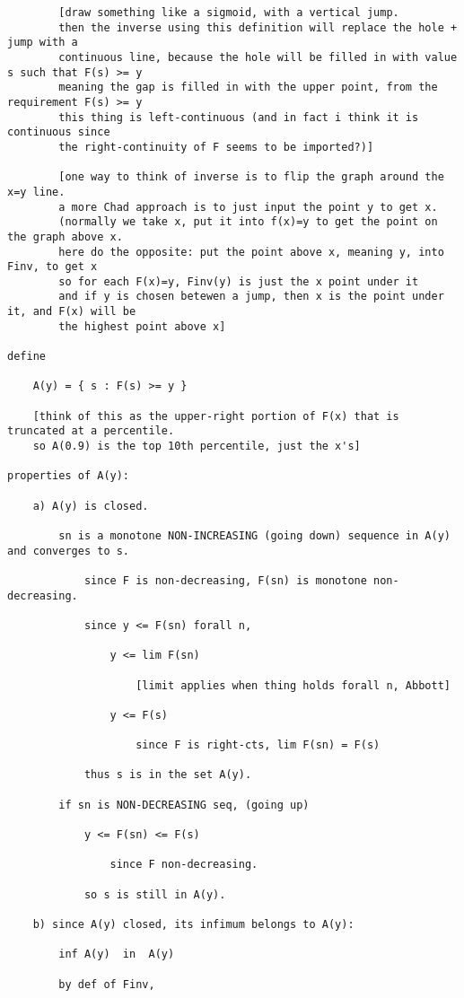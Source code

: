 \documentclass{article}
\begin{document}
\begin{flushleft}
\begin{verbatim}
		[draw something like a sigmoid, with a vertical jump.
		then the inverse using this definition will replace the hole + jump with a
		continuous line, because the hole will be filled in with value s such that F(s) >= y
		meaning the gap is filled in with the upper point, from the requirement F(s) >= y
		this thing is left-continuous (and in fact i think it is continuous since 
		the right-continuity of F seems to be imported?)]
		
		[one way to think of inverse is to flip the graph around the x=y line.
		a more Chad approach is to just input the point y to get x.
		(normally we take x, put it into f(x)=y to get the point on the graph above x.
		here do the opposite: put the point above x, meaning y, into Finv, to get x
		so for each F(x)=y, Finv(y) is just the x point under it
		and if y is chosen betewen a jump, then x is the point under it, and F(x) will be
		the highest point above x]
		
define

	A(y) = { s : F(s) >= y }
	
	[think of this as the upper-right portion of F(x) that is truncated at a percentile.
	so A(0.9) is the top 10th percentile, just the x's]
	
properties of A(y):

	a) A(y) is closed. 
		
		sn is a monotone NON-INCREASING (going down) sequence in A(y) and converges to s.
			
			since F is non-decreasing, F(sn) is monotone non-decreasing.
			
			since y <= F(sn) forall n,
			
				y <= lim F(sn)   
				
					[limit applies when thing holds forall n, Abbott]
				
				y <= F(s)
					
					since F is right-cts, lim F(sn) = F(s)	
						
			thus s is in the set A(y).

		if sn is NON-DECREASING seq, (going up)
		
			y <= F(sn) <= F(s)
			
				since F non-decreasing.
			
			so s is still in A(y).
		
	b) since A(y) closed, its infimum belongs to A(y):
	
		inf A(y)  in  A(y)
		
		by def of Finv, 
		

\end{verbatim}
\end{flushleft}
\end{document}
